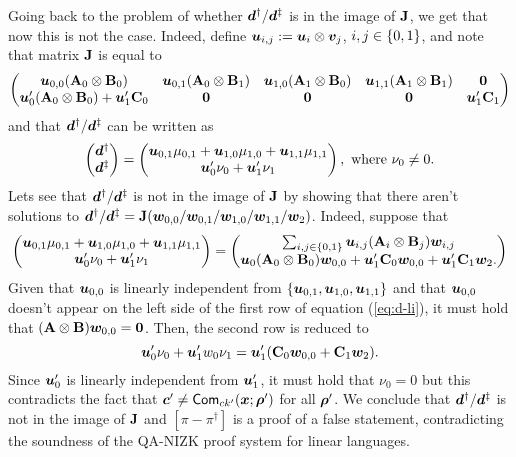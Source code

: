 Going back to the problem of whether ${\boldsymbol{d}}^\dag/ {\boldsymbol{d}}^\ddag$ is in the image of $\mathbf{{J}}$, we get that now this is not the case. Indeed, define ${\boldsymbol{u}}_{i,j}:={\boldsymbol{u}}_i\otimes{\boldsymbol{v}}_j$, $i,j\in\{0,1\}$, and note that matrix $\mathbf{{J}}$ is equal to
$$
\begin{pmatrix}
{\boldsymbol{u}}_{0,0}(\mathbf{{A}}_0\otimes\mathbf{{B}}_0) & {\boldsymbol{u}}_{0,1}(\mathbf{{A}}_0\otimes\mathbf{{B}}_1) & {\boldsymbol{u}}_{1,0}(\mathbf{{A}}_1\otimes\mathbf{{B}}_0) & {\boldsymbol{u}}_{1,1}(\mathbf{{A}}_1\otimes\mathbf{{B}}_1) & {\boldsymbol{0}}\\
{\boldsymbol{u}}'_0(\mathbf{{A}}_0\otimes\mathbf{{B}}_0) +{\boldsymbol{u}}'_1\mathbf{{C}}_0 & {\boldsymbol{0}} & {\boldsymbol{0}} & {\boldsymbol{0}} & {\boldsymbol{u}}'_1\mathbf{{C}}_1
\end{pmatrix}
$$
and that ${\boldsymbol{d}}^\dag/{\boldsymbol{d}}^\ddag$ can be written as
$$
\begin{pmatrix} {\boldsymbol{d}}^\dag\\ {\boldsymbol{d}}^\ddag \end{pmatrix}
=
\begin{pmatrix}
{\boldsymbol{u}}_{0,1}\mu_{0,1} + {\boldsymbol{u}}_{1,0}\mu_{1,0} + {\boldsymbol{u}}_{1,1}\mu_{1,1}\\
{\boldsymbol{u}}'_{0}\nu_{0} + {\boldsymbol{u}}'_1\nu_1
\end{pmatrix},
\text{ where } \nu_0 \neq 0.
$$
Lets see that ${\boldsymbol{d}}^\dag/{\boldsymbol{d}}^\ddag$ is not in the image of $\mathbf{{J}}$ by showing that there aren't solutions to ${\boldsymbol{d}}^\dag/{\boldsymbol{d}}^\ddag=\mathbf{{J}}({\boldsymbol{w}}_{0,0}/{\boldsymbol{w}}_{0,1}/{\boldsymbol{w}}_{1,0}/{\boldsymbol{w}}_{1,1}/{\boldsymbol{w}}_2)$. Indeed, suppose that
\begin{align}
\begin{pmatrix}
{\boldsymbol{u}}_{0,1}\mu_{0,1} + {\boldsymbol{u}}_{1,0}\mu_{1,0} + {\boldsymbol{u}}_{1,1}\mu_{1,1}\\
{\boldsymbol{u}}'_{0}\nu_{0} + {\boldsymbol{u}}'_1\nu_1
\end{pmatrix}
=
\begin{pmatrix}
\sum_{i,j\in\{0,1\}}{\boldsymbol{u}}_{i,j}(\mathbf{{A}}_i\otimes\mathbf{{B}}_j){\boldsymbol{w}}_{i,j}\\
{\boldsymbol{u}}_0(\mathbf{{A}}_0\otimes\mathbf{{B}}_0){\boldsymbol{w}}_{0,0} + {\boldsymbol{u}}'_1\mathbf{{C}}_0{\boldsymbol{w}}_{0,0}+{\boldsymbol{u}}'_1\mathbf{{C}}_1{\boldsymbol{w}}_2.
\end{pmatrix}
\label{eq:d-li}
\end{align}
Given that ${\boldsymbol{u}}_{0,0}$ is linearly independent from $\{{\boldsymbol{u}}_{0,1},{\boldsymbol{u}}_{1,0},{\boldsymbol{u}}_{1,1}\}$ and that ${\boldsymbol{u}}_{0,0}$ doesn't appear on the left side of the first row of equation (\ref{eq:d-li}), it must hold that $(\mathbf{{A}}\otimes\mathbf{{B}}){\boldsymbol{w}}_{0,0}={\boldsymbol{0}}$. Then, the second row is reduced to
$$
{\boldsymbol{u}}'_{0}\nu_{0} + {\boldsymbol{u}}'_1w_0\nu_1 = {\boldsymbol{u}}'_1(\mathbf{{C}}_0{\boldsymbol{w}}_{0,0}+\mathbf{{C}}_1{\boldsymbol{w}}_2).
$$
Since ${\boldsymbol{u}}'_0$ is linearly independent from ${\boldsymbol{u}}'_1$, it must hold that $\nu_0=0$ but this contradicts the fact that ${\boldsymbol{c}}'\neq\mathsf{Com}_{ck'}({\boldsymbol{x}};{\boldsymbol{\rho}}')$ for all ${\boldsymbol{\rho}}'$. We conclude that ${\boldsymbol{d}}^\dag/{\boldsymbol{d}}^\ddag$ is not in the image of $\mathbf{{J}}$ and $[\pi-\pi^\dag]$ is a proof of a false statement, contradicting the soundness of the QA-NIZK proof system for linear languages.

